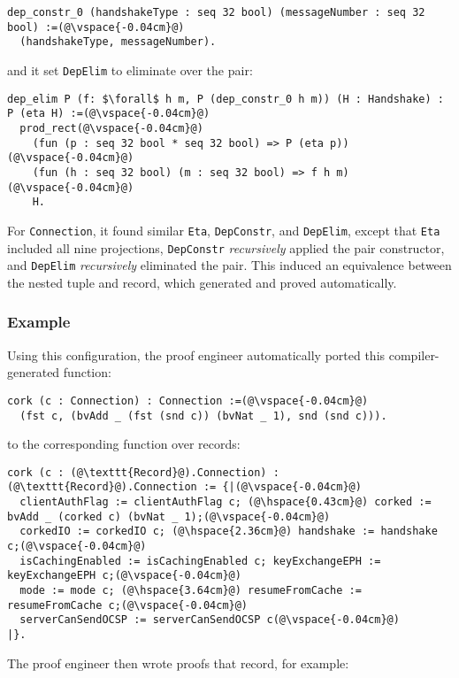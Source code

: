 \begin{lstlisting}[backgroundcolor=\color{cyan!30}]
dep_constr_0 (handshakeType : seq 32 bool) (messageNumber : seq 32 bool) :=(@\vspace{-0.04cm}@)
  (handshakeType, messageNumber).
\end{lstlisting}
and it set \lstinline{DepElim} to eliminate over the pair:

\begin{lstlisting}[backgroundcolor=\color{cyan!30}]
dep_elim P (f: $\forall$ h m, P (dep_constr_0 h m)) (H : Handshake) : P (eta H) :=(@\vspace{-0.04cm}@)
  prod_rect(@\vspace{-0.04cm}@)
    (fun (p : seq 32 bool * seq 32 bool) => P (eta p))(@\vspace{-0.04cm}@)
    (fun (h : seq 32 bool) (m : seq 32 bool) => f h m)(@\vspace{-0.04cm}@)
    H.
\end{lstlisting}
For \lstinline{Connection}, it found similar \lstinline{Eta}, \lstinline{DepConstr}, and \lstinline{DepElim},
except that \lstinline{Eta} included all nine projections, \lstinline{DepConstr} \textit{recursively} applied the
pair constructor, and \lstinline{DepElim} \textit{recursively} eliminated the pair.
This induced an equivalence between the nested tuple and record,
which \toolname generated and proved automatically.

\subsubsection{Example}
Using this configuration, the proof engineer automatically ported this compiler-generated function:

\begin{lstlisting}
cork (c : Connection) : Connection :=(@\vspace{-0.04cm}@)
  (fst c, (bvAdd _ (fst (snd c)) (bvNat _ 1), snd (snd c))).
\end{lstlisting}
to the corresponding function over records:

\begin{lstlisting}[backgroundcolor=\color{cyan!30}]
cork (c : (@\texttt{Record}@).Connection) : (@\texttt{Record}@).Connection := {|(@\vspace{-0.04cm}@)
  clientAuthFlag := clientAuthFlag c; (@\hspace{0.43cm}@) corked := bvAdd _ (corked c) (bvNat _ 1);(@\vspace{-0.04cm}@)
  corkedIO := corkedIO c; (@\hspace{2.36cm}@) handshake := handshake c;(@\vspace{-0.04cm}@)
  isCachingEnabled := isCachingEnabled c; keyExchangeEPH := keyExchangeEPH c;(@\vspace{-0.04cm}@)
  mode := mode c; (@\hspace{3.64cm}@) resumeFromCache := resumeFromCache c;(@\vspace{-0.04cm}@)
  serverCanSendOCSP := serverCanSendOCSP c(@\vspace{-0.04cm}@)
|}.
\end{lstlisting}
The proof engineer then wrote proofs that record, for example:


